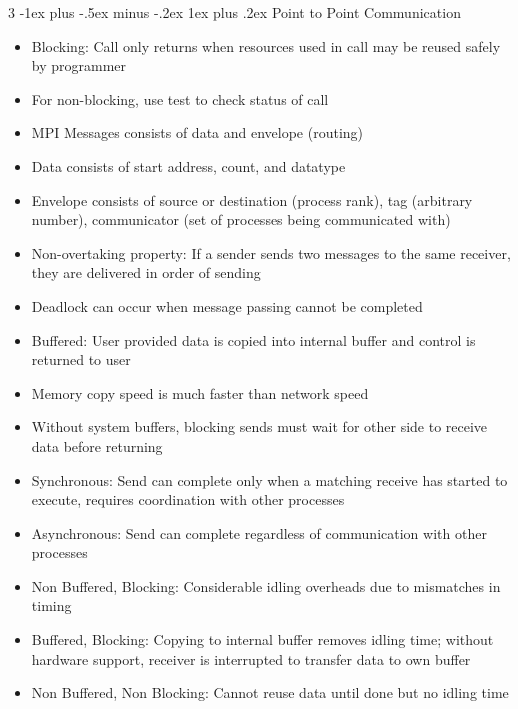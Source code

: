 \documentclass[10pt, landscape]{article}
\makeatletter
\renewcommand{\subsection}{\@startsection{subsection}{3}{0mm}%
                                {-1ex plus -.5ex minus -.2ex}%
                                {1ex plus .2ex}%
                                {\normalfont\small\bfseries}}%
\makeatother
\begin{document}
\begin{multicols*}{3}
\subsection{Point to Point Communication}
\begin{itemize}
    \item Blocking: Call only returns when resources used in call may be reused safely by programmer
    \item For non-blocking, use test to check status of call
    \item MPI Messages consists of data and envelope (routing)
    \item Data consists of start address, count, and datatype
    \item Envelope consists of source or destination (process rank), tag (arbitrary number), communicator (set of processes being communicated with)
    \item Non-overtaking property: If a sender sends two messages to the same receiver, they are delivered in order of sending
    \item Deadlock can occur when message passing cannot be completed
    \item Buffered: User provided data is copied into internal buffer and control is returned to user
    \item Memory copy speed is much faster than network speed
    \item Without system buffers, blocking sends must wait for other side to receive data before returning
    \item Synchronous: Send can complete only when a matching receive has started to execute, requires coordination with other processes
    \item Asynchronous: Send can complete regardless of communication with other processes
    \item Non Buffered, Blocking: Considerable idling overheads due to mismatches in timing
    \item Buffered, Blocking: Copying to internal buffer removes idling time; without hardware support, receiver is interrupted to transfer data to own buffer
    \item Non Buffered, Non Blocking: Cannot reuse data until done but no idling time
\end{itemize}


\end{multicols*}
\end{document}
